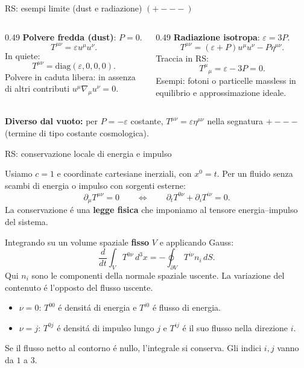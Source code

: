 \begin{frame}[t]{RS: esempi limite (dust e radiazione) $(+---)$}\small\raggedright

\begin{columns}[T,onlytextwidth]
\begin{column}{0.49\textwidth}
\textbf{Polvere fredda (dust)}: $P=0$.
\[
T^{\mu\nu}=\varepsilon u^\mu u^\nu.
\]
In quiete:
\[
T^{\mu\nu}=\mathrm{diag}(\varepsilon,0,0,0).
\]
Polvere in caduta libera: in assenza di altri contributi $u^\mu\nabla_\mu u^\nu=0$.
\end{column}
\begin{column}{0.49\textwidth}
\textbf{Radiazione isotropa}: $\varepsilon=3P$.
\[
T^{\mu\nu}=(\varepsilon+P)u^\mu u^\nu-P\eta^{\mu\nu}.
\]
Traccia in RS:
\[
T^\mu{}_{\mu}=\varepsilon-3P=0.
\]
Esempi: fotoni o particelle massless in equilibrio e approssimazione ideale.
\end{column}
\end{columns}
\medskip
\textbf{Diverso dal vuoto:} per $P=-\varepsilon$ costante,
$T^{\mu\nu}=\varepsilon\eta^{\mu\nu}$ nella segnatura $+---$ (termine di tipo costante cosmologica).

\end{frame}


\begin{frame}[t]{RS: conservazione locale di energia e impulso}
\small\raggedright
\setlength{\abovedisplayskip}{3pt plus 1pt minus 1pt}
\setlength{\belowdisplayskip}{3pt plus 1pt minus 1pt}
\setlength{\abovedisplayshortskip}{0pt plus 1pt}
\setlength{\belowdisplayshortskip}{2pt plus 1pt minus 1pt}
Usiamo $c=1$ e coordinate cartesiane inerziali, con $x^0=t$.
Per un fluido senza scambi di energia o impulso con sorgenti esterne:
\[
\boxed{\partial_\mu T^{\mu\nu}=0}
\qquad\Longleftrightarrow\qquad
\partial_tT^{0\nu}+\partial_iT^{i\nu}=0.
\]
La conservazione \'e una \textbf{legge fisica} che imponiamo al tensore
energia--impulso del sistema.

\medskip
Integrando su un volume spaziale \textbf{fisso} $V$ e applicando Gauss:
\[
\frac{d}{dt}\int_V T^{0\nu}\,d^3x
=-\oint_{\partial V}T^{i\nu}n_i\,dS.
\]
Qui $n_i$ sono le componenti della normale spaziale uscente.
La variazione del contenuto \'e l'opposto del flusso uscente.

\medskip
\begin{itemize}
\item $\nu=0$: $T^{00}$ \'e densit\'a di energia e $T^{i0}$ \'e flusso di energia.
\item $\nu=j$: $T^{0j}$ \'e densit\'a di impulso lungo $j$ e $T^{ij}$
\'e il suo flusso nella direzione $i$.
\end{itemize}
Se il flusso netto al contorno \'e nullo, l'integrale si conserva.
Gli indici $i,j$ vanno da $1$ a $3$.
\end{frame}

